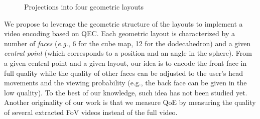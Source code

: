 \begin{figure}[t]
\centering
{}
\caption{Projections into four geometric layouts}\label{fig:mapping}
\end{figure}

We propose to leverage the geometric structure of the layouts
to implement a video encoding based on \ac{QEC}. Each geometric layout is characterized
by a number of \emph{faces} (\textit{e.g.}, 6 for
the cube map, 12 for the dodecahedron) and a given \emph{central point} (which corresponds
to a position and an angle in the sphere).
From a given central point and a given layout, our idea is to encode the front face in full
quality while the quality of other faces can be adjusted to the user's head movements and the viewing
probability (e.g., the back face can be given in the low quality).
To the best of our knowledge, such idea has not been studied yet. Another originality of
our work is that we measure \ac{QoE} by measuring the quality of several extracted
\ac{FoV}
videos instead
of the full video.

